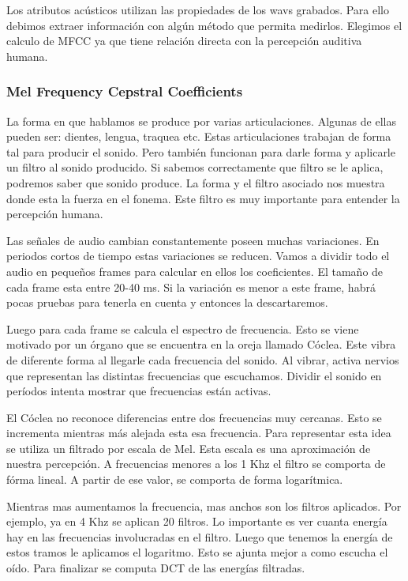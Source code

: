 \documentclass[11pt,a4paper,twoside]{tesis}
\begin{document}
Los atributos acústicos utilizan las propiedades de los wavs grabados. Para ello debimos extraer información con algún método que permita medirlos. Elegimos el calculo de MFCC ya que tiene relación directa con la percepción auditiva humana. 


\subsubsection{Mel Frequency Cepstral Coefficients}


La forma en que hablamos se produce por varias articulaciones. Algunas de ellas pueden ser: dientes, lengua, traquea etc. Estas articulaciones trabajan de forma tal para producir el sonido. Pero también funcionan para darle forma y aplicarle un filtro al sonido producido. Si sabemos correctamente que filtro se le aplica, podremos saber que sonido produce. La forma y el filtro asociado nos muestra donde esta la fuerza en el fonema. Este filtro es muy importante para entender la percepción humana.

Las señales de audio cambian constantemente poseen muchas variaciones. En periodos cortos de tiempo estas variaciones se reducen. Vamos a dividir todo el audio en pequeños frames para calcular en ellos los coeficientes. El tamaño de cada frame esta entre 20-40 ms. Si la variación es menor a este frame, habrá pocas pruebas para tenerla en cuenta y entonces la descartaremos.

Luego para cada frame se calcula el espectro de frecuencia. Esto se viene motivado por un órgano que se encuentra en la oreja llamado Cóclea. Este vibra de diferente forma al llegarle cada frecuencia del sonido. Al vibrar, activa nervios que representan las distintas frecuencias que escuchamos. Dividir el sonido en períodos intenta mostrar que frecuencias están activas.

El Cóclea no reconoce diferencias entre dos frecuencias muy cercanas. Esto se incrementa mientras más alejada esta esa frecuencia. Para representar esta idea se utiliza un filtrado por escala de Mel. Esta escala es una aproximación de nuestra percepción. A frecuencias menores a los 1 Khz el filtro se comporta de fórma lineal. A partir de ese valor, se comporta de forma logarítmica. 


Mientras mas aumentamos la frecuencia, mas anchos son los filtros aplicados. Por ejemplo, ya en 4 Khz se aplican 20 filtros. Lo importante es ver cuanta energía hay en las frecuencias involucradas en el filtro. Luego que tenemos la energía de estos tramos le aplicamos el logaritmo. Esto se ajunta mejor a como escucha el oído. Para finalizar se computa DCT de las energías filtradas. 
\end{document}
